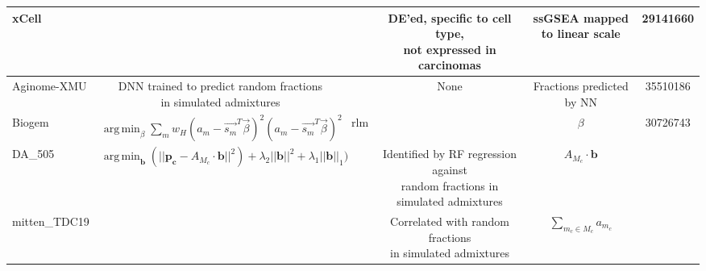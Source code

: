 \documentclass[border=3mm,preview]{standalone}
\DeclareMathOperator*{\argmin}{arg\,min}
\newcommand{\mybf}{\fontseries{b}\selectfont} %
\begin{document}
\begin{threeparttable}
\begin{tabular}{lccccc}
    \mybf xCell & & & \makecell{DE’ed, specific to cell type,\\not expressed in carcinomas}& \makecell{ssGSEA mapped\\to linear scale} & 29141660 \\
\hline    
    \mybf Aginome-XMU & \makecell{DNN trained to predict random fractions\\in simulated admixtures} & & None & Fractions predicted by NN & 35510186 \\
    \mybf Biogem & $\argmin_\beta \sum_m w_H(a_m - \vec{s_m}^T \vec{\beta})^2 (a_m - \vec{s_m}^T \vec{\beta})^2$ & rlm & & $\beta$ & 30726743 \\
    \mybf DA\_505 & $\argmin_\mathbf{b} (||\mathbf{p_c} - A_{M_c} \cdot \mathbf{b}||^2) + \lambda_2||\mathbf{b}||^2 + \lambda_1 ||\mathbf{b}||_1) $ & & \makecell{Identified by RF regression against\\random fractions in simulated admixtures} & $A_{M_c} \cdot \mathbf{b}$ & \\
    \mybf mitten\_TDC19 & & & \makecell{Correlated with random fractions\\in simulated admixtures} & $\sum_{m_c \in M_c} a_{m_c}$ & \\
    \midrule
\end{tabular}
\caption*{$|e|_\epsilon \equiv 0 \text{if } |e| < \epsilon; |e| - \epsilon \text{otherwise}$ \\
$w_H(e) \equiv 1 \text{if } |e| < k;  k/|e| \text{otherwise}$}

\end{threeparttable}
\end{document}
